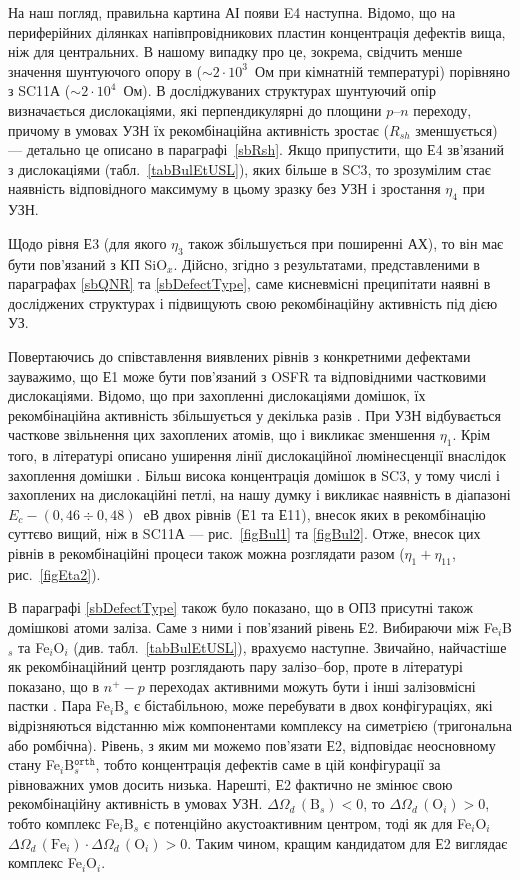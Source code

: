 На наш погляд, правильна картина АІ появи E4 наступна.
Відомо, що на периферійних ділянках напівпровідникових пластин концентрація дефектів вища,
ніж для центральних.
В нашому випадку про це, зокрема, свідчить менше значення шунтуючого опору в ($\sim2\cdot10^{3}$~Ом при кімнатній температурі) порівняно з SC11А ($\sim2\cdot10^{4}$~Ом).
В досліджуваних структурах шунтуючий опір визначається дислокаціями, які перпендикулярні до площини $p$--$n$ переходу, причому в умовах УЗН їх рекомбінаційна активність зростає ($R_{sh}$ зменшується) --- детально це описано в параграфі~\ref{sbRsh}.
Якщо припустити, що Е4 зв'язаний з дислокаціями (табл.~\ref{tabBulEtUSL}), яких більше в SC3, то зрозумілим стає наявність відповідного максимуму в цьому зразку без УЗН і зростання $\eta_4$ при УЗН.

Щодо рівня Е3 (для якого $\eta_3$ також збільшується при поширенні АХ),
то він має бути пов'язаний з КП SiO$_x$.
Дійсно, згідно з результатами, представленими в параграфах \ref{sbQNR} та \ref{sbDefectType},
саме кисневмісні преципітати наявні в досліджених структурах і підвищують свою рекомбінаційну активність під дією УЗ.

Повертаючись до співставлення виявлених рівнів з конкретними дефектами зауважимо,
що Е1 може бути пов'язаний з OSFR та відповідними частковими дислокаціями.
Відомо, що при захопленні дислокаціями домішок, їх рекомбінаційна активність
збільшується у декілька разів \cite{disl10:Kveder,Kittler2003}.
При УЗН відбувається часткове звільнення цих захоплених атомів, що і викликає
зменшення  $\eta_1$.
Крім того, в літературі описано уширення  лінії дислокаційної люмінесценції внаслідок захоплення домішки  \cite{PhysRevB56:10208}.
Більш висока концентрація домішок в SC3, у тому числі і захоплених на дислокаційні петлі,
на нашу думку і викликає наявність в діапазоні $E_c-(0,46\div0,48)$~еВ двох рівнів (Е1 та Е11),
внесок яких в рекомбінацію суттєво вищий, ніж в SC11А --- рис.~\ref{figBul1} та \ref{figBul2}.
Отже, внесок цих рівнів в рекомбінаційні процеси також можна розглядати разом ($\eta_1+\eta_{11}$, рис.~\ref{figEta2}).

В параграфі \ref{sbDefectType} також було показано, що в ОПЗ присутні також домішкові атоми заліза.
Саме з ними і пов'язаний рівень Е2.
Вибираючи між Fe$_i$B$_s$ та Fe$_i$O$_i$ (див. табл.~\ref{tabBulEtUSL}), врахуємо наступне.
Звичайно, найчастіше як рекомбінаційний центр розглядають пару залізо--бор,
проте в літературі показано, що в $n^+-p$ переходах активними можуть бути і інші
залізовмісні пастки \cite{TeimurazPSS,TeimurazJAP}.
Пара  Fe$_i$B$_s$ є бістабільною, може перебувати в двох конфігураціях, які відрізняються відстанню між компонентами комплексу на симетрією (тригональна або ромбічна).
Рівень, з яким ми можемо пов'язати Е2, відповідає неосновному стану Fe$_i$B$_s^\mathtt{orth}$, тобто концентрація дефектів саме в цій конфігурації за рівноважних умов досить низька.
Нарешті, Е2 фактично не змінює свою рекомбінаційну активність в умовах УЗН.
$\Delta\Omega_d\,(\mbox{B}_s)<0$, то $\Delta\Omega_d\,(\mbox{O}_i)>0$, тобто комплекс
Fe$_i$B$_s$ є потенційно акустоактивним центром, тоді як для Fe$_i$O$_i$
$\Delta\Omega_d\,(\mbox{Fe}_i)\cdot\Delta\Omega_d\,(\mbox{O}_i)>0$.
Таким чином, кращим кандидатом для Е2 виглядає комплекс Fe$_i$O$_i$.

